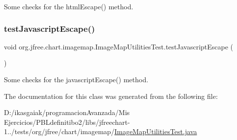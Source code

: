 Some checks for the html\+Escape() method. \mbox{\label{classorg_1_1jfree_1_1chart_1_1imagemap_1_1_image_map_utilities_test_adc24f21e076ab489e7e9455566b84e3f}} 
\subsubsection{\texorpdfstring{test\+Javascript\+Escape()}{testJavascriptEscape()}}
{\footnotesize\ttfamily void org.\+jfree.\+chart.\+imagemap.\+Image\+Map\+Utilities\+Test.\+test\+Javascript\+Escape (\begin{DoxyParamCaption}{ }\end{DoxyParamCaption})}

Some checks for the javascript\+Escape() method. 

The documentation for this class was generated from the following file\+:\begin{DoxyCompactItemize}
\item 
D\+:/ikasgaiak/programacion\+Avanzada/\+Mis Ejercicios/\+P\+B\+Ldefinitibo2/libs/jfreechart-\/1../tests/org/jfree/chart/imagemap/\mbox{\hyperlink{_image_map_utilities_test_8java}{Image\+Map\+Utilities\+Test.\+java}}\end{DoxyCompactItemize}
